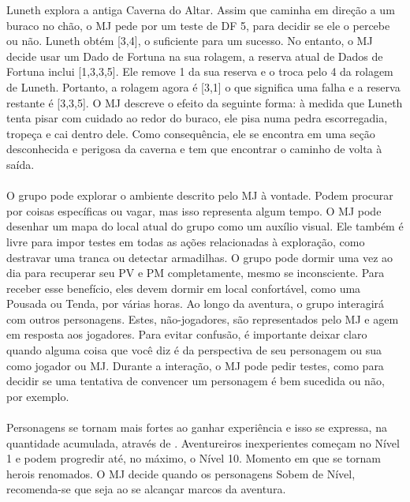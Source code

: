 %
\ofpar
%
{
	Luneth explora a antiga Caverna do Altar. 
	Assim que caminha em direção a um buraco no chão, o MJ pede por um teste de DF 5, para decidir se ele o percebe ou não. Luneth obtém [3,4], o suficiente para um sucesso. 
	No entanto, o MJ decide usar um Dado de Fortuna na sua rolagem, a reserva atual de Dados de Fortuna inclui [1,3,3,5]. 
	Ele remove 1 da sua reserva e o troca pelo 4 da rolagem de Luneth. 
	Portanto, a rolagem agora é [3,1] o que significa uma falha e a reserva restante é [3,3,5]. 
	O MJ descreve o efeito da seguinte forma: à medida que Luneth tenta pisar com cuidado ao redor do buraco, ele pisa numa pedra escorregadia, tropeça e cai dentro dele. 
	Como consequência, ele se encontra em uma seção desconhecida e perigosa da caverna e tem que encontrar o caminho de volta à saída.
}
%
\ofpar
%
\\\\
%
	 O grupo pode explorar o ambiente descrito pelo MJ à vontade. 
	 Podem procurar por coisas específicas ou vagar, mas isso representa algum tempo. 
	 O MJ pode desenhar um mapa do local atual do grupo como um auxílio visual. 
	 Ele também é livre para impor testes em todas as ações relacionadas à exploração, como destravar uma tranca ou detectar armadilhas. 
	 O grupo pode dormir uma vez ao dia para recuperar seu PV e PM completamente, mesmo se inconsciente.
	 Para receber esse benefício, eles devem dormir em local confortável, como uma Pousada ou Tenda, por várias horas. 
	 Ao longo da aventura, o grupo interagirá com outros personagens. 
	 Estes, não-jogadores, são representados pelo MJ e agem em resposta aos jogadores.
	 Para evitar confusão, é importante deixar claro quando alguma coisa que você diz é da perspectiva de seu personagem ou sua como jogador ou MJ. 
	 Durante a interação, o MJ pode pedir testes, como para decidir se uma tentativa de convencer um personagem é bem sucedida ou não, por exemplo.
%
\vfill
%
\\\\
%
Personagens se tornam mais fortes ao ganhar experiência e isso se expressa, na quantidade acumulada, através de .
Aventureiros inexperientes começam no Nível 1 e podem progredir até, no máximo, o Nível 10. Momento em que se tornam herois renomados. 
O MJ decide quando os personagens Sobem de Nível, recomenda-se que seja ao se alcançar marcos da aventura. 
